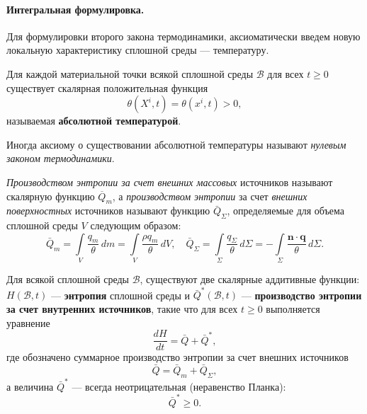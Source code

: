 
\paragraph{Интегральная формулировка.} Для формулировки второго закона термодинамики, аксиоматически введем новую локальную характеристику сплошной среды --- температуру.

\begin{axiom*}
	Для каждой материальной точки всякой сплошной среды $\mathcal{B}$ для всех $t \geqslant 0$ существует скалярная положительная функция \begin{equation*}
		\theta(X^i, t) = \theta(x^i, t) > 0,
	\end{equation*}
	называемая \textbf{абсолютной температурой}.
\end{axiom*} 

Иногда аксиому о существовании абсолютной температуры называют \textit{нулевым законом термодинамики}. 

\begin{definition*}
	\textit{Производством энтропии за счет внешних массовых} источников называют скалярную функцию $\overline{Q}_{m}$, а \textit{производством энтропии} за счет \textit{внешних поверхностных} источников называют функцию $\bar{Q}_{\Sigma}$, определяемые для объема сплошной среды $V$ следующим образом:
	\begin{equation*}
		\bar{Q}_m = \int\limits_{V} \frac{q_m}{\theta} \, dm = \int\limits_{V}\frac{\rho q_m}{\theta} \, dV, \quad \bar{Q}_{\Sigma} = \int\limits_{\Sigma} \frac{q_{\Sigma}}{\theta} \, d\Sigma = - \int\limits_{\Sigma} \frac{\mathbf{n} \cdot \mathbf{q}}{\theta} \, d\Sigma.
	\end{equation*}
\end{definition*}

\begin{axiom*}
	Для всякой сплошной среды $\mathcal{B}$, существуют две скалярные аддитивные функции: $H(\mathcal{B}, t)$ --- \textbf{энтропия} сплошной среды и $\bar{Q}^{\ast}(\mathcal{B}, t)$ --- \textbf{производство энтропии за счет внутренних источников}, такие что для всех $t \geqslant 0$ выполняется уравнение 
	\begin{equation*}
		\frac{dH}{dt} = \bar{Q} + \bar{Q}^{\ast},
	\end{equation*}
	где обозначено суммарное производство энтропии за счет внешних источников
	\begin{equation*}
		\bar{Q} = \bar{Q}_m + \bar{Q}_{\Sigma},
	\end{equation*}
	а величина $\bar{Q}^{\ast}$ --- всегда неотрицательная (неравенство Планка):
	\begin{equation*}
		\bar{Q}^{\ast} \geqslant 0.
	\end{equation*}
\end{axiom*}

